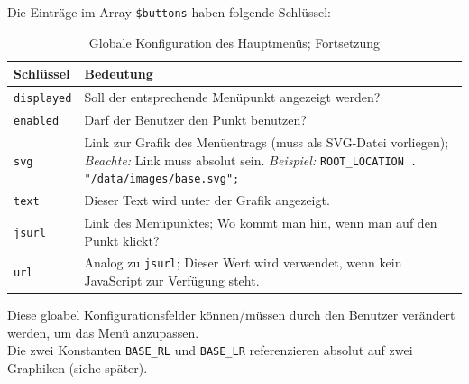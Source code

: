 Die Einträge im Array \texttt{\$buttons} haben folgende Schlüssel:\\
\begin{table}[H]
\centering
\begin{tabular}{p{2.5 cm}p{11 cm}}
	\toprule
		\textbf{Schlüssel} & \textbf{Bedeutung} \\
	\midrule
		\texttt{displayed} & Soll der entsprechende Menüpunkt angezeigt werden?\\
		\hline
		\texttt{enabled} & Darf der Benutzer den Punkt benutzen?\\
		\hline
		\texttt{svg} & Link zur Grafik des Menüentrags (muss als SVG-Datei vorliegen); \newline
			\textit{Beachte:} Link muss absolut sein.\newline
			\textit{Beispiel:} \texttt{ROOT\_LOCATION . "/data/images/base.svg";}
			\\
		\hline
		\texttt{text} & Dieser Text wird unter der Grafik angezeigt.\\
		\hline
		\texttt{jsurl} & Link des Menüpunktes; Wo kommt man hin, wenn man auf den Punkt klickt?\\
		\hline
		\texttt{url} & Analog zu \texttt{jsurl}; Dieser Wert wird verwendet, wenn kein JavaScript zur Verfügung steht.\\
	\bottomrule
\end{tabular}
\caption{Globale Konfiguration des Hauptmenüs; Fortsetzung}
\label{tab:content_imple_design_menu_buttons}
\end{table}
Diese gloabel Konfigurationsfelder können/müssen durch den Benutzer verändert werden, um das Menü anzupassen.\\
Die zwei Konstanten \texttt{BASE\_RL} und \texttt{BASE\_LR} referenzieren absolut auf zwei Graphiken (siehe später).
\newpage
